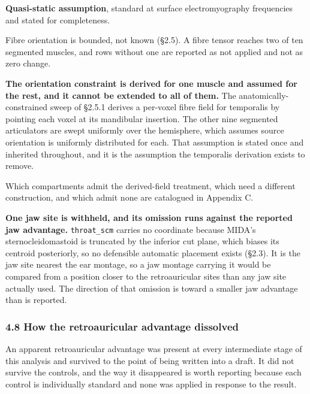 \documentclass[manuscript,review,anonymous]{acmart}
\newcounter{none}
\begin{document}
\textbf{Quasi-static assumption}, standard at surface electromyography frequencies
and stated for completeness.

Fibre orientation is bounded, not known (\S{}2.5). A fibre tensor reaches two of
ten segmented muscles, and rows without one are reported as not applied and not
as zero change.

\textbf{The orientation constraint is derived for one muscle and assumed for the rest,
and it cannot be extended to all of them.} The anatomically-constrained sweep of
\S{}2.5.1 derives a per-voxel fibre field for temporalis by pointing each voxel at
its mandibular insertion. The other nine segmented articulators are swept
uniformly over the hemisphere, which assumes source orientation is uniformly
distributed for each. That assumption is stated once and inherited throughout,
and it is the assumption the temporalis derivation exists to remove.

Which compartments admit the derived-field treatment, which need a different construction, and which admit none are catalogued in Appendix C.

\textbf{One jaw site is withheld, and its omission runs against the reported jaw
advantage.} \texttt{throat\_scm} carries no coordinate because MIDA's
sternocleidomastoid is truncated by the inferior cut plane, which biases its
centroid posteriorly, so no defensible automatic placement exists (\S{}2.3). It is
the jaw site nearest the ear montage, so a jaw montage carrying it would be
compared from a position closer to the retroauricular sites than any jaw site
actually used. The direction of that omission is toward a smaller jaw advantage
than is reported.

\subsubsection{4.8 How the retroauricular advantage dissolved}\label{how-the-retroauricular-advantage-dissolved}

An apparent retroauricular advantage was present at every intermediate stage of
this analysis and survived to the point of being written into a draft. It did not
survive the controls, and the way it disappeared is worth reporting because each
control is individually standard and none was applied in response to the result.
\end{document}
